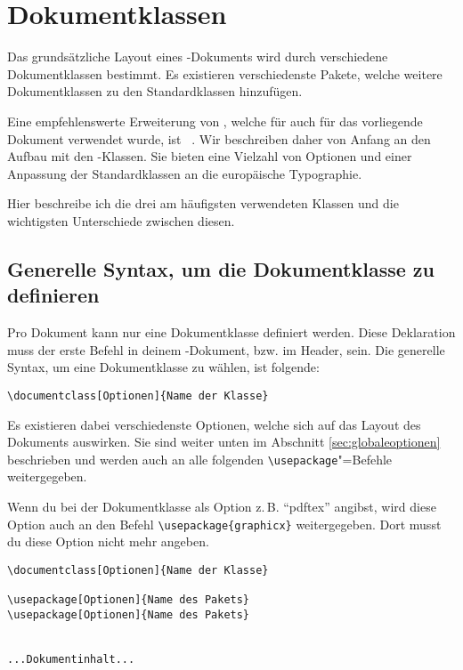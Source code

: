 %
%

\chapter{Dokumentklassen}
\label{sec:dokumentklassen}

Das grundsätzliche Layout eines \DMLLaTeX-Dokuments wird durch verschiedene Dokumentklassen bestimmt. Es existieren verschiedenste Pakete, welche weitere Dokumentklassen zu den Standardklassen hinzufügen.

Eine empfehlenswerte Erweiterung von \DMLLaTeX, welche für auch für das vorliegende Dokument verwendet wurde, ist \KOMAScript~\cite{KOMA}. Wir beschreiben daher von Anfang an den Aufbau mit den \KOMAScript-Klassen. Sie bieten eine Vielzahl von Optionen und einer Anpassung der Standardklassen an die europäische Typographie.

Hier beschreibe ich die drei am häufigsten verwendeten Klassen und die wichtigsten Unterschiede zwischen diesen.

\section{Generelle Syntax, um die Dokumentklasse zu definieren}

Pro Dokument kann nur eine Dokumentklasse definiert werden. Diese Deklaration muss der erste Befehl in deinem \DMLLaTeX-Dokument, bzw. im Header, sein. Die generelle Syntax, um eine Dokumentklasse zu wählen, ist folgende:
\begin{lstlisting}
\documentclass[Optionen]{Name der Klasse}
\end{lstlisting}

Es existieren dabei verschiedenste Optionen, welche sich auf das Layout des Dokuments auswirken. Sie sind weiter unten im Abschnitt \ref{sec:globaleoptionen} beschrieben und werden auch an alle folgenden \texttt{\textbackslash usepackage}"=Befehle weitergegeben. 

Wenn du bei der Dokumentklasse als Option z.\,B. \enquote{pdftex} angibst, wird diese Option auch an den Befehl \texttt{\textbackslash usepackage\{graphicx\}} weitergegeben. Dort musst du diese Option nicht mehr angeben.
\begin{lstlisting}
\documentclass[Optionen]{Name der Klasse}

\usepackage[Optionen]{Name des Pakets}
\usepackage[Optionen]{Name des Pakets}


...Dokumentinhalt...

\end{lstlisting}

